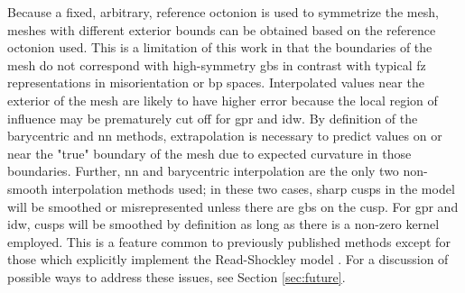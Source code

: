 \documentclass[preprint,12pt]{elsarticle}
\begin{document}
Because a fixed, arbitrary, reference octonion is used to symmetrize the mesh, meshes with different exterior bounds can be obtained based on the reference octonion used. This is a limitation of this work in that the boundaries of the mesh do not correspond with high-symmetry \glspl{gb} in contrast with typical \gls{fz} representations in misorientation \cite{reynoldsInterfacesCrystallineMaterials1997} or \gls{bp} \cite{patalaSymmetriesRepresentationGrain2013,homerGrainBoundaryPlane2015} spaces. Interpolated values near the exterior of the mesh are likely to have higher error because the local region of influence may be prematurely cut off for \gls{gpr} and \gls{idw}. By definition of the barycentric and \gls{nn} methods, extrapolation is necessary to predict values on or near the "true" boundary of the mesh due to expected curvature in those boundaries. Further, \gls{nn} and barycentric interpolation are the only two non-smooth interpolation methods used; in these two cases, sharp cusps in the model will be smoothed or misrepresented unless there are \glspl{gb} on the cusp. For \gls{gpr} and \gls{idw}, cusps will be smoothed by definition as long as there is a non-zero kernel employed. This is a feature common to previously published methods \cite{liRelativeGrainBoundary2009,shenDeterminingGrainBoundary2019,chesserLearningGrainBoundary2020} except for those \cite{bulatovGrainBoundaryEnergy2014,shekhawatGeneralizedReadShockley2016} which explicitly implement the Read-Shockley model \cite{readDislocationModelsCrystal1950}. For a discussion of possible ways to address these issues, see Section \ref{sec:future}.

  
\end{document}

